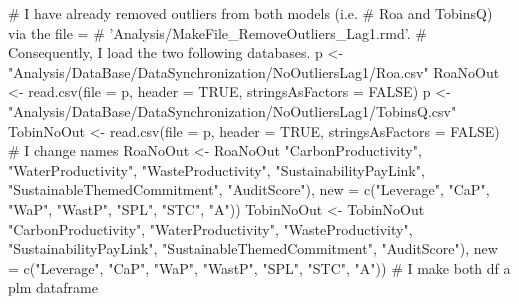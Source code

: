 \documentclass[12pt,]{article}
\newenvironment{Shaded}{}{}
\newcommand{\KeywordTok}[1]{\textcolor[rgb]{0.00,0.00,1.00}{#1}}
\newcommand{\DataTypeTok}[1]{#1}
\newcommand{\StringTok}[1]{\textcolor[rgb]{0.00,0.50,0.50}{#1}}
\newcommand{\CommentTok}[1]{\textcolor[rgb]{0.00,0.50,0.00}{#1}}
\newcommand{\OtherTok}[1]{\textcolor[rgb]{1.00,0.25,0.00}{#1}}
\newcommand{\OperatorTok}[1]{#1}
\newcommand{\NormalTok}[1]{#1}
\begin{document}
\begin{Shaded}
\begin{Highlighting}[]
\CommentTok{# I have already removed outliers from both models (i.e.}
\CommentTok{# Roa and TobinsQ) via the file =}
\CommentTok{# 'Analysis/MakeFile_RemoveOutliers_Lag1.rmd'.}
\CommentTok{# Consequently, I load the two following databases.}
\NormalTok{p <-}\StringTok{ "Analysis/DataBase/DataSynchronization/NoOutliersLag1/Roa.csv"}
\NormalTok{RoaNoOut <-}\StringTok{ }\KeywordTok{read.csv}\NormalTok{(}\DataTypeTok{file =}\NormalTok{ p, }\DataTypeTok{header =} \OtherTok{TRUE}\NormalTok{, }\DataTypeTok{stringsAsFactors =} \OtherTok{FALSE}\NormalTok{)}
\NormalTok{p <-}\StringTok{ "Analysis/DataBase/DataSynchronization/NoOutliersLag1/TobinsQ.csv"}
\NormalTok{TobinNoOut <-}\StringTok{ }\KeywordTok{read.csv}\NormalTok{(}\DataTypeTok{file =}\NormalTok{ p, }\DataTypeTok{header =} \OtherTok{TRUE}\NormalTok{, }\DataTypeTok{stringsAsFactors =} \OtherTok{FALSE}\NormalTok{)}
\CommentTok{# I change names}
\NormalTok{RoaNoOut <-}\StringTok{ }\NormalTok{RoaNoOut }\OperatorTok{%
    \StringTok{"CarbonProductivity"}\NormalTok{, }\StringTok{"WaterProductivity"}\NormalTok{, }\StringTok{"WasteProductivity"}\NormalTok{, }
    \StringTok{"SustainabilityPayLink"}\NormalTok{, }\StringTok{"SustainableThemedCommitment"}\NormalTok{, }
    \StringTok{"AuditScore"}\NormalTok{), }\DataTypeTok{new =} \KeywordTok{c}\NormalTok{(}\StringTok{"Leverage"}\NormalTok{, }\StringTok{"CaP"}\NormalTok{, }\StringTok{"WaP"}\NormalTok{, }\StringTok{"WastP"}\NormalTok{, }
    \StringTok{"SPL"}\NormalTok{, }\StringTok{"STC"}\NormalTok{, }\StringTok{"A"}\NormalTok{))}
\NormalTok{TobinNoOut <-}\StringTok{ }\NormalTok{TobinNoOut }\OperatorTok{%
    \StringTok{"CarbonProductivity"}\NormalTok{, }\StringTok{"WaterProductivity"}\NormalTok{, }\StringTok{"WasteProductivity"}\NormalTok{, }
    \StringTok{"SustainabilityPayLink"}\NormalTok{, }\StringTok{"SustainableThemedCommitment"}\NormalTok{, }
    \StringTok{"AuditScore"}\NormalTok{), }\DataTypeTok{new =} \KeywordTok{c}\NormalTok{(}\StringTok{"Leverage"}\NormalTok{, }\StringTok{"CaP"}\NormalTok{, }\StringTok{"WaP"}\NormalTok{, }\StringTok{"WastP"}\NormalTok{, }
    \StringTok{"SPL"}\NormalTok{, }\StringTok{"STC"}\NormalTok{, }\StringTok{"A"}\NormalTok{))}
\CommentTok{# I make both df a plm dataframe}
}}
\end{Highlighting}
\end{Shaded}
\end{document}
